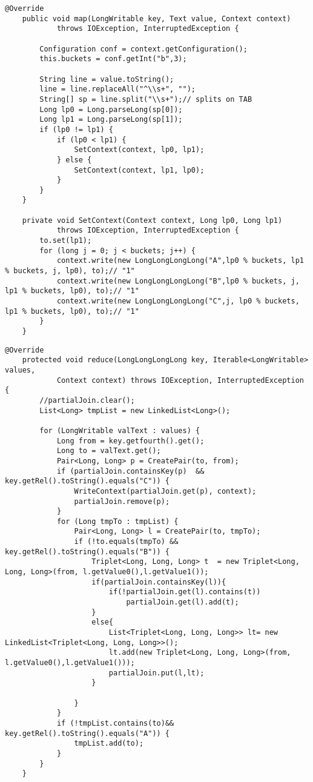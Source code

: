 \documentclass[paper=a4, fontsize=11pt]{scrartcl}	%
\numberwithin{equation}{section}															%
\numberwithin{figure}{section}																%
\numberwithin{table}{section}																%
\begin{document}
\begin{lstlisting}[label=Mapper,caption=Implementazione del Mapper single Job]
	@Override
	public void map(LongWritable key, Text value, Context context)
			throws IOException, InterruptedException {

		Configuration conf = context.getConfiguration();
		this.buckets = conf.getInt("b",3);
		
		String line = value.toString();
		line = line.replaceAll("^\\s+", "");
		String[] sp = line.split("\\s+");// splits on TAB
		Long lp0 = Long.parseLong(sp[0]);
		Long lp1 = Long.parseLong(sp[1]);
		if (lp0 != lp1) {
			if (lp0 < lp1) {
				SetContext(context, lp0, lp1);
			} else {
				SetContext(context, lp1, lp0);
			}
		}
	}

	private void SetContext(Context context, Long lp0, Long lp1)
			throws IOException, InterruptedException {
		to.set(lp1);
		for (long j = 0; j < buckets; j++) {
			context.write(new LongLongLongLong("A",lp0 % buckets, lp1 % buckets, j, lp0), to);// "1"
			context.write(new LongLongLongLong("B",lp0 % buckets, j, lp1 % buckets, lp0), to);// "1"
			context.write(new LongLongLongLong("C",j, lp0 % buckets, lp1 % buckets, lp0), to);// "1"
		}
	}
\end{lstlisting}


\begin{lstlisting}[label=Reducer,caption=Implementazione del Reducer single Job]
	@Override
	protected void reduce(LongLongLongLong key, Iterable<LongWritable> values,
			Context context) throws IOException, InterruptedException {
		//partialJoin.clear();
		List<Long> tmpList = new LinkedList<Long>();

		for (LongWritable valText : values) {
			Long from = key.getfourth().get();
			Long to = valText.get();
			Pair<Long, Long> p = CreatePair(to, from);
			if (partialJoin.containsKey(p)	&& key.getRel().toString().equals("C")) {
				WriteContext(partialJoin.get(p), context);
				partialJoin.remove(p);
			}
			for (Long tmpTo : tmpList) {
				Pair<Long, Long> l = CreatePair(to, tmpTo);
				if (!to.equals(tmpTo) && key.getRel().toString().equals("B")) {
					Triplet<Long, Long, Long> t  = new Triplet<Long, Long, Long>(from, l.getValue0(),l.getValue1());
					if(partialJoin.containsKey(l)){
						if(!partialJoin.get(l).contains(t))
							partialJoin.get(l).add(t);
					}
					else{
						List<Triplet<Long, Long, Long>> lt= new LinkedList<Triplet<Long, Long, Long>>();
						lt.add(new Triplet<Long, Long, Long>(from, l.getValue0(),l.getValue1()));						
						partialJoin.put(l,lt);						
					}
						
				}
			}
			if (!tmpList.contains(to)&& key.getRel().toString().equals("A")) {
				tmpList.add(to);
			}
		}
	}
\end{lstlisting}
\end{document}
